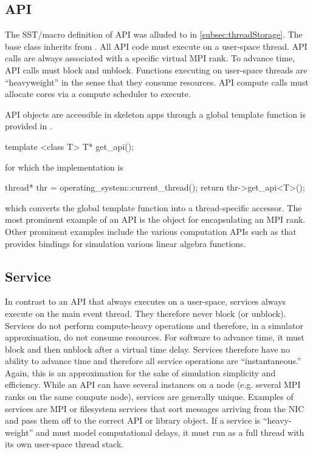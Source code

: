 \subsection{API}
\label{subsec:softwareAPI}
The SST/macro definition of API was alluded to in \ref{subsec:threadStorage}.
The base  class inherits from .
All API code must execute on a user-space thread.
API calls are always associated with a specific virtual MPI rank.
To advance time, API calls must block and unblock.
Functions executing on user-space threads are ``heavyweight'' in the sense that they consume resources.
API compute calls must allocate cores via a compute scheduler to execute.


API objects are accessible in skeleton apps through a global template function is provided in .

\begin{CppCode}
template <class T>
T* get_api();
\end{CppCode}
for which the implementation is

\begin{CppCode}
thread* thr = operating_system::current_thread();
return thr->get_api<T>();
\end{CppCode}
which converts the global template function into a thread-specific accessor.
The most prominent example of an API is the  object for encapsulating an MPI rank.
Other prominent examples include the various computation APIs such as  that provides bindings for simulation various linear algebra functions.


\subsection{Service}
\label{subsec:service}
In contrast to an API that always executes on a user-space, services always execute on the main event thread.
They therefore never block (or unblock).
Services do not perform compute-heavy operations and therefore, in a simulator approximation, do not consume resources. 
For software to advance time, it must block and then unblock after a virtual time delay.
Services therefore have no ability to advance time and therefore all service operations are ``instantaneous.''
Again, this is an approximation for the sake of simulation simplicity and efficiency.
While an API can have several instances on a node (e.g. several MPI ranks on the same compute node), services are generally unique.
Examples of services are MPI or filesystem services that sort messages arriving from the NIC and pass them off to the correct API or library object.
If a service is ``heavy-weight'' and must model computational delays,
it must run as a full thread with its own user-space thread stack.

